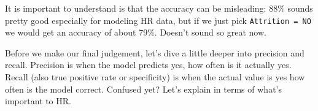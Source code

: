 \documentclass[]{book}
\newenvironment{Shaded}{\begin{snugshade}}{\end{snugshade}}
\newcommand{\CommentTok}[1]{\textcolor[rgb]{0.56,0.35,0.01}{\textit{#1}}}
\newcommand{\DecValTok}[1]{\textcolor[rgb]{0.00,0.00,0.81}{#1}}
\newcommand{\KeywordTok}[1]{\textcolor[rgb]{0.13,0.29,0.53}{\textbf{#1}}}
\newcommand{\NormalTok}[1]{#1}
\newcommand{\OperatorTok}[1]{\textcolor[rgb]{0.81,0.36,0.00}{\textbf{#1}}}
\newcommand{\StringTok}[1]{\textcolor[rgb]{0.31,0.60,0.02}{#1}}
\begin{document}
\begin{Shaded}
\end{Shaded}

It is important to understand is that the accuracy can be misleading: 88\% sounds pretty good especially for modeling HR data, but if we just pick \texttt{Attrition\ =\ NO} we would get an accuracy of about 79\%. Doesn't sound so great now.

Before we make our final judgement, let's dive a little deeper into precision and recall. Precision is when the model predicts yes, how often is it actually yes. Recall (also true positive rate or specificity) is when the actual value is yes how often is the model correct. Confused yet? Let's explain in terms of what's important to HR.
\end{document}

